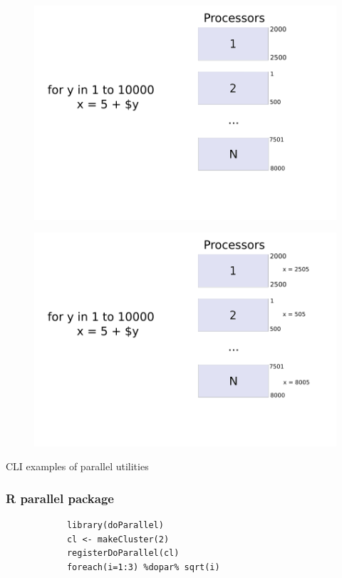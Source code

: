 
\begin{frame}
		\begin{figure}
				\includegraphics[width=0.8\linewidth]{figures/diagrams/forloop/fordiagram}
		\end{figure}	
\end{frame}

\begin{frame}
		\begin{figure}
				\includegraphics[width=0.8\linewidth]{figures/diagrams/forloop/fordiagram2}
		\end{figure}	
\end{frame}

\begin{frame}
		CLI examples of parallel utilities
\end{frame}


\begin{frame}[fragile]
		\frametitle{R parallel package}
		\center
		\begin{verbatim}
			library(doParallel)
			cl <- makeCluster(2)
			registerDoParallel(cl)
			foreach(i=1:3) %dopar% sqrt(i)
		\end{verbatim}
\end{frame}

